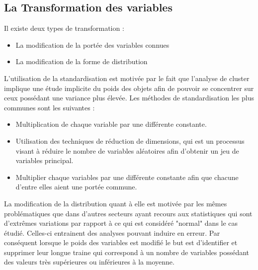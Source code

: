 \documentclass[memoire.tex]{subfiles}
\begin{document}
\subsection{La Transformation des variables}
Il existe deux types de transformation : \begin{itemize}
\item La modification de la portée des variables connues
\item{La modification de la forme de distribution}
\end{itemize}
L'utilisation de la standardisation est motivée par le fait que l'analyse de cluster implique une étude implicite du poids des objets afin de pouvoir se concentrer sur ceux possédant une variance plus élevée. Les méthodes de standardisation les plus communes sont les suivantes \cite{ref9} : \begin{itemize}
\item Multiplication de chaque variable par une différente constante.
\item Utilisation des techniques de réduction de dimensions, qui est un processus visant à réduire le nombre de variables aléatoires afin d'obtenir un jeu de variables principal.
\item Multiplier chaque variables par une différente constante afin que chacune d'entre elles aient une portée commune.
\end{itemize}
La modification de la distribution quant à elle est motivée par les mêmes problématiques que dans d'autres secteurs ayant recours aux statistiques qui sont d'extrêmes variations par rapport à ce qui est considéré "normal" dans le cas étudié. Celles-ci entrainent des analyses pouvant induire en erreur. Par conséquent lorsque le poids des variables est modifié le but est d'identifier et supprimer leur longue traine qui correspond à un nombre de variables possédant des valeurs très supérieures ou inférieures à la moyenne.
\end{document}
